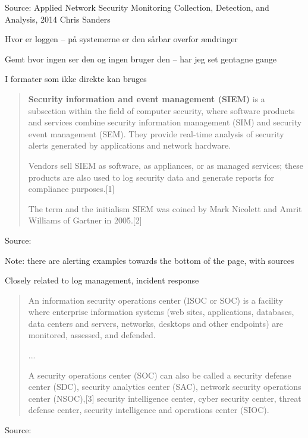 \documentclass[Screen16to9,17pt]{foils}
\begin{document}
Source: Applied Network Security Monitoring Collection, Detection, and Analysis, 2014 Chris Sanders

\begin{list2}
\item Hvor er loggen -- på systemerne er den sårbar overfor ændringer
\item Gemt hvor ingen ser den og ingen bruger den -- har jeg set gentagne gange
\item I formater som ikke direkte kan bruges
\end{list2}






\begin{quote}
{\bf Security information and event management (SIEM)} is a subsection within the field of computer security, where software products and services combine security information management (SIM) and security event management (SEM). They provide real-time analysis of security alerts generated by applications and network hardware.

  Vendors sell SIEM as software, as appliances, or as managed services; these products are also used to log security data and generate reports for compliance purposes.[1]

  The term and the initialism SIEM was coined by Mark Nicolett and Amrit Williams of Gartner in 2005.[2]
\end{quote}
Source: 

\begin{list2}
  \item Note: there are alerting examples towards the bottom of the page, with sources
  \item Closely related to log management, incident response
\end{list2}




\begin{quote}
An information security operations center (ISOC or SOC) is a facility where enterprise information systems (web sites, applications, databases, data centers and servers, networks, desktops and other endpoints) are monitored, assessed, and defended.

...

A security operations center (SOC) can also be called a security defense center (SDC), security analytics center (SAC), network security operations center (NSOC),[3] security intelligence center, cyber security center, threat defense center, security intelligence and operations center (SIOC).
\end{quote}
Source: 
\end{document}
